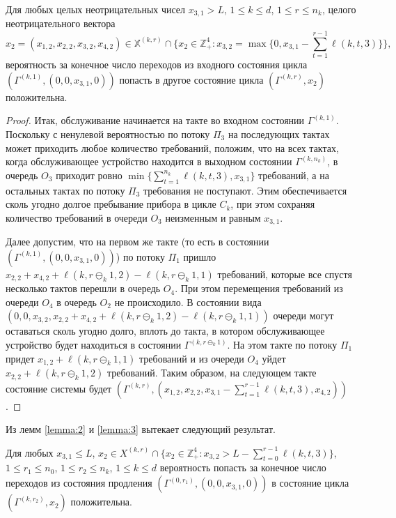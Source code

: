 \documentclass[a4paper,12pt,russian]{extarticle}
\begin{document}
\begin{lemma}
Для любых целых неотрицательных чисел $x_{3,1} > L$, $1 \leqslant k \leqslant d$, $1 \leqslant r \leqslant n_k$, целого неотрицательного вектора
\begin{equation*}
x_2 = (x_{1,2}, x_{2,2}, x_{3,2}, x_{4,2}) \in {\mathbb X}^{(k,r)} \cap \{x_2\in \mathbb{Z}_+^4 \colon x_{3,2} = \max{\{0,x_{3,1} - \sum_{t=1}^{r-1}\ell(k,t,3)\}}\},
\end{equation*} 
вероятность за конечное число переходов из входного состояния цикла $(\Gamma^{(k,1)}, (0,0,x_{3,1},0))$ попасть в другое состояние цикла $(\Gamma^{(k,r)},x_2)$ положительна.
\label{lemma:3}
\end{lemma}
\begin{proof}
Итак, обслуживание начинается на такте во входном состоянии $\Gamma^{(k,1)}$. Поскольку с ненулевой вероятностью по потоку $\Pi_3$ на последующих тактах может приходить любое количество требований, положим, что на всех тактах, когда обслуживающее устройство находится в выходном состоянии $\Gamma^{(k,n_k)}$, в очередь $O_3$ приходит ровно $\min{\{\sum_{t=1}^{n_k} \ell(k,t,3),x_{3,1}\}}$ требований, а на остальных тактах по потоку $\Pi_3$ требования не поступают. Этим обеспечивается сколь угодно долгое пребывание прибора в цикле $C_k$, при этом сохраняя количество требований в очереди $O_3$ неизменным и равным $x_{3,1}$.

Далее допустим, что на первом же такте (то есть в состоянии $(\Gamma^{(k,1)}, (0,0,x_{3,1},0))$) по потоку $\Pi_1$ пришло $x_{2,2}+x_{4,2} + \ell(k,r\ominus_k 1,2) - \ell(k,r\ominus_k 1,1)$ требований, которые все спустя несколько тактов перешли в очередь $O_4$. При этом перемещения требований из очереди $O_4$ в очередь $O_2$ не происходило. 
В состоянии вида $(0, 0, x_{3,2}, x_{2,2}+x_{4,2} + \ell(k,r\ominus_k 1,2) - \ell(k,r\ominus_k 1,1))$ очереди могут оставаться сколь угодно долго, вплоть до такта, в котором обслуживающее устройство  будет находиться в состоянии $\Gamma^{(k,r\ominus_k 1)}$. На этом такте по потоку $\Pi_1$ придет $x_{1,2}+\ell(k,r\ominus_k 1,1)$ требований и из очереди $O_4$ уйдет $x_{2,2}+\ell(k,r\ominus_k 1,2)$ требований. Таким образом, на следующем такте состояние системы будет $(\Gamma^{(k,r)},(x_{1,2},x_{2,2},x_{3,1}-\sum_{t=1}^{r-1}\ell(k,t,3),x_{4,2}))$.
\end{proof}

Из лемм \ref{lemma:2} и \ref{lemma:3} вытекает следующий результат.
\begin{lemma}
Для любых $x_{3,1} \leqslant L$, $x_2 \in X^{(k,r)} \cap \{x_2\in \mathbb{Z}_+^4 \colon x_{3,2} > L - \sum_{t=0}^{r-1}\ell(k,t,3)\}$, $1 \leqslant r_1 \leqslant n_0$, $1 \leqslant r_2 \leqslant n_k$, $1 \leqslant k \leqslant d$ вероятность попасть за конечное число переходов из состояния продления $(\Gamma^{(0,r_1)},(0,0,x_{3,1},0))$ в состояние цикла $(\Gamma^{(k,r_2)},x_2)$ положительна.
\label{lemma:4}
\end{lemma}
\end{document}
